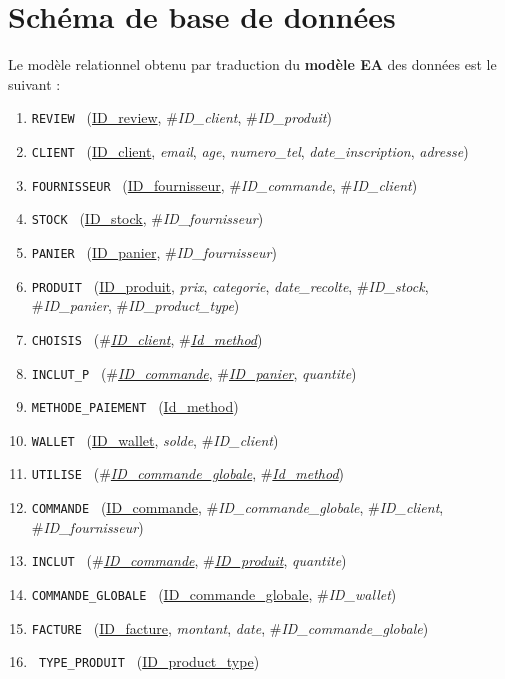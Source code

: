 \documentclass[a4paper,12pt]{book}
\newcommand{\attr}[1]{\emph{#1}}
\newcommand{\texit}[1]{\#\textsl{#1}}
\theoremstyle{break}
\theoremstyle{break}
\theoremstyle{break}
\theoremstyle{break}
\theoremstyle{definition}
\theoremstyle{remark}
\begin{document}
\section{Schéma de base de données}
Le modèle relationnel obtenu par traduction du \textbf{modèle EA} des données est le suivant :
\begin{enumerate}
  \item { \texttt{REVIEW } (\underline{ID\_review}, \texit{ID\_client}, \texit{ID\_produit}) }
  \item { \texttt{CLIENT } (\underline{ID\_client}, \attr{email}, \attr{age}, \attr{numero\_tel}, \attr{date\_inscription}, \attr{adresse}) }
  \item { \texttt{FOURNISSEUR } (\underline{ID\_fournisseur}, \texit{ID\_commande}, \texit{ID\_client}) }
  \item { \texttt{STOCK } (\underline{ID\_stock}, \texit{ID\_fournisseur}) }
  \item { \texttt{PANIER } (\underline{ID\_panier}, \texit{ID\_fournisseur}) }
  \item { \texttt{PRODUIT } (\underline{ID\_produit}, \attr{prix}, \attr{categorie}, \attr{date\_recolte}, \texit{ID\_stock}, \texit{ID\_panier}, \texit{ID\_product\_type}) }
  \item { \texttt{CHOISIS } (\texit{\underline{ID\_client}}, \texit{\underline{Id\_method}}) }
  \item { \texttt{INCLUT\_P } (\texit{\underline{ID\_commande}}, \texit{\underline{ID\_panier}}, \attr{quantite}) }
  \item { \texttt{METHODE\_PAIEMENT } (\underline{Id\_method}) }
  \item { \texttt{WALLET } (\underline{ID\_wallet}, \attr{solde}, \texit{ID\_client}) }
  \item { \texttt{UTILISE } (\texit{\underline{ID\_commande\_globale}}, \texit{\underline{Id\_method}}) }
  \item { \texttt{COMMANDE } (\underline{ID\_commande}, \texit{ID\_commande\_globale}, \texit{ID\_client}, \texit{ID\_fournisseur}) }
  \item { \texttt{INCLUT } (\texit{\underline{ID\_commande}}, \texit{\underline{ID\_produit}}, \attr{quantite}) }
  \item { \texttt{COMMANDE\_GLOBALE } (\underline{ID\_commande\_globale}, \texit{ID\_wallet}) }
  \item { \texttt{FACTURE } (\underline{ID\_facture}, \attr{montant}, \attr{date}, \texit{ID\_commande\_globale}) }
  \item{ \texttt{ TYPE\_PRODUIT } (\underline{ID\_product\_type})}
\end{enumerate}
\end{document}
